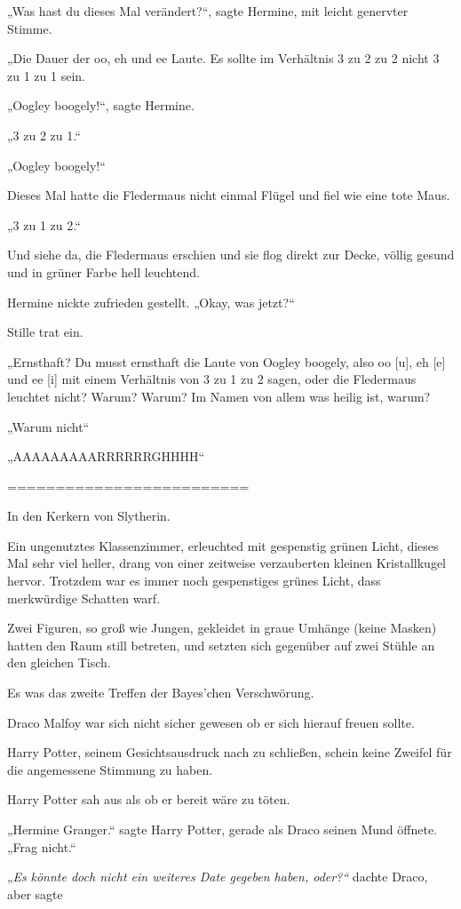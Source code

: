 {„Was hast du dieses Mal verändert?“, sagte Hermine, mit leicht genervter Stimme.

„Die Dauer der oo, eh und ee Laute. Es sollte im Verhältnis 3 zu 2 zu 2 nicht 3 zu 1 zu 1 sein.

„Oogley boogely!“, sagte Hermine.

„3 zu 2 zu 1.“

„Oogley boogely!“

Dieses Mal hatte die Fledermaus nicht einmal Flügel und fiel wie eine tote Maus.

„3 zu 1 zu 2.“

Und siehe da, die Fledermaus erschien und sie flog direkt zur Decke, völlig gesund und in grüner Farbe hell leuchtend.

Hermine nickte zufrieden gestellt. „Okay, was jetzt?“

Stille trat ein.

„Ernsthaft? Du musst ernsthaft die Laute von Oogley boogely, also oo {[}u{]}, eh {[}e{]} und ee {[}i{]} mit einem Verhältnis von 3 zu 1 zu 2 sagen, oder die Fledermaus leuchtet nicht? Warum? Warum? Im Namen von allem was heilig ist, warum?

„Warum nicht“

„AAAAAAAAARRRRRRGHHHH“

=========================

In den Kerkern von Slytherin.

Ein ungenutztes Klassenzimmer, erleuchted mit gespenstig grünen Licht, dieses Mal sehr viel heller, drang von einer zeitweise verzauberten kleinen Kristallkugel hervor. Trotzdem war es immer noch gespenstiges grünes Licht, dass merkwürdige Schatten warf.

Zwei Figuren, so groß wie Jungen, gekleidet in graue Umhänge (keine Masken) hatten den Raum still betreten, und setzten sich gegenüber auf zwei Stühle an den gleichen Tisch.

Es was das zweite Treffen der Bayes'chen Verschwörung.

Draco Malfoy war sich nicht sicher gewesen ob er sich hierauf freuen sollte.

Harry Potter, seinem Gesichtsausdruck nach zu schließen, schein keine Zweifel für die angemessene Stimmung zu haben.

Harry Potter sah aus als ob er bereit wäre zu töten.

„Hermine Granger.“ sagte Harry Potter, gerade als Draco seinen Mund öffnete. „Frag nicht.“

„\emph{Es} \emph{könnte doch nicht ein weiteres Date gegeben haben, oder?“} dachte Draco, aber sagte

}
